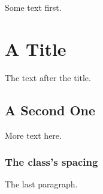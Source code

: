 \documentclass{article}
\begin{document}
Some text first.

\section{A Title}
The text after the title.

\subsection{A Second One}
More text here.

\subsubsection{The class's spacing}
The last paragraph.
\end{document}
